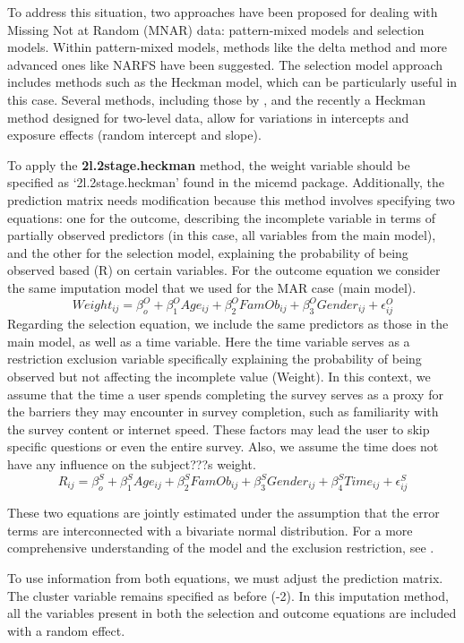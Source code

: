 \documentclass[
]{jss}
\begin{document}
To address this situation, two approaches have been proposed for dealing
with Missing Not at Random (MNAR) data: pattern-mixed models and
selection models. Within pattern-mixed models, methods like the delta
method and more advanced ones like NARFS have been suggested. The
selection model approach includes methods such as the Heckman model,
which can be particularly useful in this case. Several methods,
including those by \cite{Galimar_2017,Hammon_2021}, and the recently a
Heckman method designed for two-level data, allow for variations in
intercepts and exposure effects (random intercept and slope).

To apply the \textbf{2l.2stage.heckman} method, the weight variable
should be specified as `2l.2stage.heckman' found in the micemd package.
Additionally, the prediction matrix needs modification because this
method involves specifying two equations: one for the outcome,
describing the incomplete variable in terms of partially observed
predictors (in this case, all variables from the main model), and the
other for the selection model, explaining the probability of being
observed based (R) on certain variables. For the outcome equation we
consider the same imputation model that we used for the MAR case (main
model).
\[Weight_{ij}= \beta^O_{o} + \beta^O_{1}Age_{ij} + \beta^O_{2}FamOb_{ij}+ \beta^O_{3}Gender_{ij} + \epsilon^O_{ij}\]
Regarding the selection equation, we include the same predictors as
those in the main model, as well as a time variable. Here the time
variable serves as a restriction exclusion variable specifically
explaining the probability of being observed but not affecting the
incomplete value (Weight). In this context, we assume that the time a
user spends completing the survey serves as a proxy for the barriers
they may encounter in survey completion, such as familiarity with the
survey content or internet speed. These factors may lead the user to
skip specific questions or even the entire survey. Also, we assume the
time does not have any influence on the subject???s weight.
\[R_{ij}= \beta^S_{o} + \beta^S_{1}Age_{ij} + \beta^S_{2}FamOb_{ij}+ \beta^S_{3}Gender_{ij} +\beta^S_{4}Time_{ij}+ \epsilon^S_{ij}\]

These two equations are jointly estimated under the assumption that the
error terms are interconnected with a bivariate normal distribution. For
a more comprehensive understanding of the model and the exclusion
restriction, see \cite{Munoz_2022}.

To use information from both equations, we must adjust the prediction
matrix. The cluster variable remains specified as before (-2). In this
imputation method, all the variables present in both the selection and
outcome equations are included with a random effect.
\end{document}
